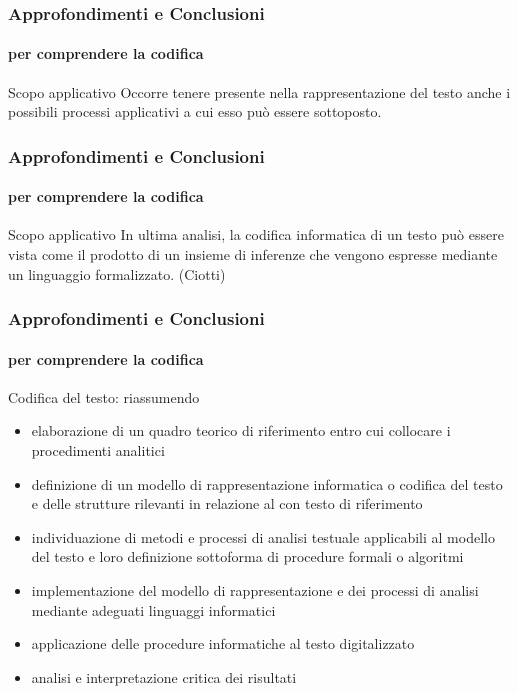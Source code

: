 \begin{frame}
	\frametitle{Approfondimenti e Conclusioni}
	\framesubtitle{per comprendere la codifica}
	\addtocounter{nframe}{1}
     
     \begin{block}{Scopo applicativo}
		 Occorre tenere presente nella rappresentazione del testo anche i possibili processi applicativi a cui esso può essere sottoposto.
	 \end{block}

\end{frame}


\begin{frame}
	\frametitle{Approfondimenti e Conclusioni}
	\framesubtitle{per comprendere la codifica}
	\addtocounter{nframe}{1}
     
     \begin{block}{Scopo applicativo}
        In ultima analisi, la codifica informatica di un testo può essere vista come il prodotto di un insieme di inferenze che vengono espresse mediante un linguaggio formalizzato. (Ciotti)
	 \end{block}

\end{frame}

\begin{frame}
	\frametitle{Approfondimenti e Conclusioni}
	\framesubtitle{per comprendere la codifica}
	\addtocounter{nframe}{1}
     
     \begin{block}{Codifica del testo: riassumendo}
       \begin{itemize}
           \item elaborazione di un quadro teorico di riferimento entro cui collocare i procedimenti analitici
           \item definizione di un modello di rappresentazione informatica o codifica del testo e delle strutture rilevanti in relazione al con testo di riferimento
           \item individuazione di metodi e processi di analisi testuale applicabili al modello del testo e loro definizione sottoforma di procedure formali o algoritmi
           \item implementazione del modello di rappresentazione e dei processi di analisi mediante adeguati linguaggi informatici
           \item applicazione delle procedure informatiche al testo digitalizzato
           \item analisi e interpretazione critica dei risultati
       \end{itemize}
	 \end{block}

\end{frame}

